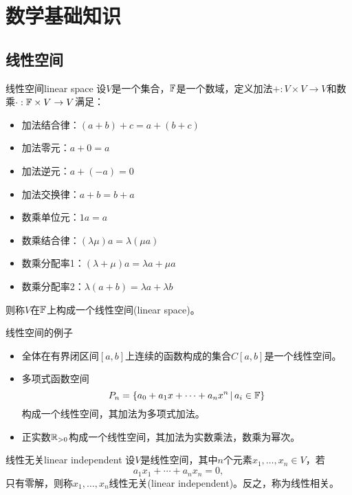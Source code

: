 \chapter{数学基础知识}
\label{chap:math basics}

\section{线性空间}
\label{sec:linear space}

\begin{definition}
    {线性空间}{linear space}
    设$V$是一个集合，$\mathbb F$是一个数域，定义加法$+:V\times V\to V$和数乘$\cdot:\mathbb F\times V\to V$满足：
    \begin{itemize}
        \item 加法结合律：$(a+b)+c=a+(b+c)$
        \item 加法零元：$a+0=a$
        \item 加法逆元：$a+(-a)=0$
        \item 加法交换律：$a+b=b+a$
        \item 数乘单位元：$1a=a$
        \item 数乘结合律：$(\lambda\mu)a=\lambda(\mu a)$
        \item 数乘分配率1：$(\lambda+\mu)a=\lambda a+\mu a$
        \item 数乘分配率2：$\lambda(a+b)=\lambda a+\lambda b$
    \end{itemize}
    则称$V$在$\mathbb F$上构成一个线性空间(linear space)。
\end{definition}

\begin{example}
    {线性空间的例子}{}
    \begin{itemize}
        \item 全体在有界闭区间$[a,b]$上连续的函数构成的集合$C[a,b]$是一个线性空间。
        \item 多项式函数空间
        \[
            P_n=\left\{a_0+a_1x+\cdots+a_nx^n\,\middle\vert\,a_i\in\mathbb F\right\}
        \]
        构成一个线性空间，其加法为多项式加法。
        \item 正实数$\mathbb R_{>0}$构成一个线性空间，其加法为实数乘法，数乘为幂次。
    \end{itemize}
\end{example}

\begin{definition}
    {线性无关}{linear independent}
    设$V$是线性空间，其中$n$个元素$x_1,\ldots,x_n\in V$，若%
    \begin{equation}
        a_1x_1+\cdots+a_nx_n=0,
    \end{equation}
    只有零解，则称$x_1,\ldots,x_n$线性无关(linear independent)。反之，称为线性相关。
\end{definition}


